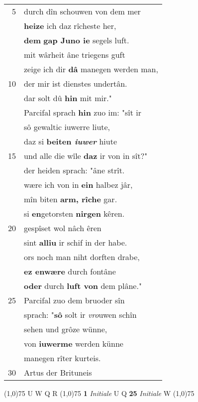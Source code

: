 \documentclass[8pt,a4paper,notitlepage]{article}
\begin{document}
\begin{table}[ht]
\begin{minipage}[t]{0.5\linewidth}
\begin{tabular}{rl}
5 & durch dîn schouwen von dem mer\\ 
 & \textbf{heize} ich daz rîcheste her,\\ 
 & \textbf{dem} \textbf{gap Juno ie} segels luft.\\ 
 & mit wârheit âne triegens guft\\ 
 & zeige ich dir \textbf{dâ} manegen werden man,\\ 
10 & der mir ist dienstes undertân.\\ 
 & dar solt dû \textbf{hin} mit mir."\\ 
 & Parcifal sprach \textbf{hin} zuo im: "sît ir\\ 
 & sô gewaltic iuwerre liute,\\ 
 & daz si \textbf{beiten \textit{iuwer}} hiute\\ 
15 & und alle die wîle \textbf{daz} ir von in sît?"\\ 
 & der heiden sprach: "âne strît.\\ 
 & wære ich von in \textbf{ein} halbez jâr,\\ 
 & mîn biten \textbf{arm, rîche} gar.\\ 
 & si \textbf{en}getorsten \textbf{nirgen} kêren.\\ 
20 & gespîset wol nâch êren\\ 
 & sint \textbf{alliu} ir schif in der habe.\\ 
 & ors noch man niht dorften drabe,\\ 
 & \textbf{ez enwære} durch fontâne\\ 
 & \textbf{oder} durch \textbf{luft von} dem plâne."\\ 
25 & Parcifal zuo dem bruoder sîn\\ 
 & sprach: "\textbf{sô} solt ir \textit{vro}uwen schîn\\ 
 & sehen und grôze wünne,\\ 
 & von \textbf{iuwerme} werden künne\\ 
 & manegen rîter kurteis.\\ 
30 & Artus der Brituneis\\ 
\end{tabular}
\scriptsize
\line(1,0){75} \newline
U W Q R \newline
\line(1,0){75} \newline
\textbf{1} \textit{Initiale} U Q  \textbf{25} \textit{Initiale} W  \newline
\line(1,0){75} \newline

\end{minipage}
\end{table}
\end{document}
